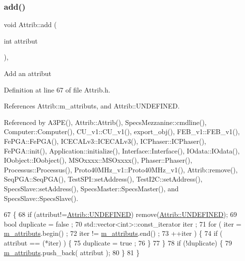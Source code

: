 \subsubsection{\texorpdfstring{add()}{add()}}
{\footnotesize\ttfamily void Attrib\+::add (\begin{DoxyParamCaption}\item[{int}]{attribut }\end{DoxyParamCaption})\hspace{0.3cm}{\ttfamily [inline]}, {\ttfamily [inherited]}}

Add an attribut 

Definition at line 67 of file Attrib.\+h.



References Attrib\+::m\+\_\+attributs, and Attrib\+::\+U\+N\+D\+E\+F\+I\+N\+ED.



Referenced by A3\+P\+E(), Attrib\+::\+Attrib(), Specs\+Mezzanine\+::cmdline(), Computer\+::\+Computer(), C\+U\+\_\+v1\+::\+C\+U\+\_\+v1(), export\+\_\+obj(), F\+E\+B\+\_\+v1\+::\+F\+E\+B\+\_\+v1(), Fe\+P\+G\+A\+::\+Fe\+P\+G\+A(), I\+C\+E\+C\+A\+Lv3\+::\+I\+C\+E\+C\+A\+Lv3(), I\+C\+Phaser\+::\+I\+C\+Phaser(), Fe\+P\+G\+A\+::init(), Application\+::initialize(), Interface\+::\+Interface(), I\+Odata\+::\+I\+Odata(), I\+Oobject\+::\+I\+Oobject(), M\+S\+Oxxxx\+::\+M\+S\+Oxxxx(), Phaser\+::\+Phaser(), Processus\+::\+Processus(), Proto40\+M\+Hz\+\_\+v1\+::\+Proto40\+M\+Hz\+\_\+v1(), Attrib\+::remove(), Seq\+P\+G\+A\+::\+Seq\+P\+G\+A(), Test\+S\+P\+I\+::set\+Address(), Test\+I2\+C\+::set\+Address(), Specs\+Slave\+::set\+Address(), Specs\+Master\+::\+Specs\+Master(), and Specs\+Slave\+::\+Specs\+Slave().


\begin{DoxyCode}
67                             \{
68     \textcolor{keywordflow}{if} (attribut!=\hyperlink{classAttrib_a69e171d7cc6417835a5a306d3c764235a3a8da2ab97dda18aebab196fe4100531}{Attrib::UNDEFINED}) \textcolor{keyword}{remove}(\hyperlink{classAttrib_a69e171d7cc6417835a5a306d3c764235a3a8da2ab97dda18aebab196fe4100531}{Attrib::UNDEFINED});
69     \textcolor{keywordtype}{bool} duplicate = false ;
70     std::vector<int>::const\_iterator iter ;
71     \textcolor{keywordflow}{for} ( iter  = \hyperlink{classAttrib_ac4bd58a0cc6b38a3b711d609a3d3aacc}{m\_attributs}.begin() ;
72           iter != \hyperlink{classAttrib_ac4bd58a0cc6b38a3b711d609a3d3aacc}{m\_attributs}.end()   ;
73           ++iter ) \{
74       \textcolor{keywordflow}{if} ( attribut == (*iter) ) \{
75         duplicate = true ;
76       \}
77     \}
78     \textcolor{keywordflow}{if} (!duplicate) \{
79       \hyperlink{classAttrib_ac4bd58a0cc6b38a3b711d609a3d3aacc}{m\_attributs}.push\_back( attribut );
80     \}
81   \}
\end{DoxyCode}
\mbox{\label{classHierarchy_ad677774ff38fcb257c04a3a10d471fac}} 
